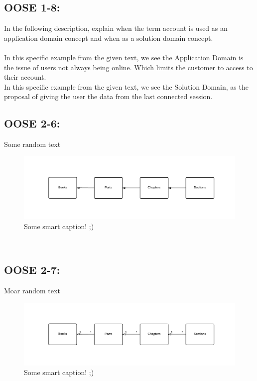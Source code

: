 \documentclass[11pt,a4paper]{article}
\begin{document}
\subsection{OOSE 1-8:}
In the following description, explain when the term account is used as an application domain concept and when as a solution domain concept.\\\\
In this specific example from the given text, we see the Application Domain is the issue of users not always being online. Which limits the customer to access to their account.\\
In this specific example from the given text, we see the Solution Domain, as the proposal of giving the user the data from the last connected session.\\
\newpage
\subsection{OOSE 2-6:}
Some random text \\
\begin{figure}[h!]
    \centering
    \includegraphics[width=1.1\textwidth]{pictures/oose2_6}
    \caption{Some smart caption! ;)}
    \label{fig:OOSE26}
\end{figure}
\\

\subsection{OOSE 2-7:}
Moar random text \\
\begin{figure}[h!]
    \centering
    \includegraphics[width=1.1\textwidth]{pictures/oose2_7}
    \caption{Some smart caption! ;)}
    \label{fig:OOSE27}
\end{figure}
\\
\end{document}
